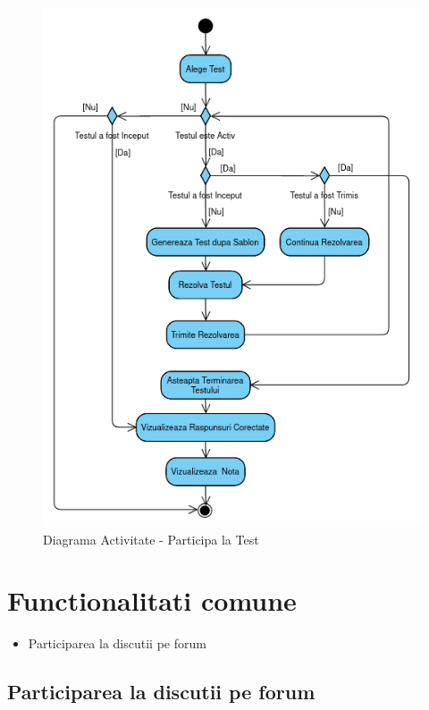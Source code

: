 \documentclass[12pt, a4paper, oneside, romanian]{teza-upb}
\begin{document}
\begin{figure}[H]
\centering
\includegraphics*[width=0.75\columnwidth]{diagrama-activitate-participa-la-test}
\caption{Diagrama Activitate - Participa la Test}
\label{diagrama-activitate-participa-la-test}
\end{figure}

\section{Functionalitati comune}

\begin{itemize}
	\item Participarea la discutii pe forum
\end{itemize}

\subsection{Participarea la discutii pe forum}
\end{document}
